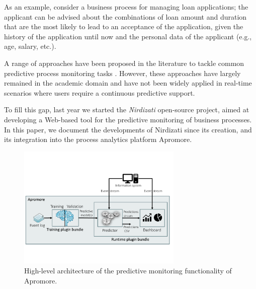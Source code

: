 \documentclass[runningheads,a4paper]{llncs}
\begin{document}
As an example, consider a business process for managing loan applications; the applicant can be advised about the combinations of loan amount and duration that are the most likely to lead to an acceptance of the application, given the history of the application until now and the personal data of the applicant (e.g., age, salary, etc.).

A range of approaches have been proposed in the literature to tackle common predictive process monitoring tasks \cite{Chamorro2017}.
However, these approaches have largely remained in the academic domain and have not been widely applied in real-time scenarios where users require a continuous predictive support.

To fill this gap, last year we started the \emph{Nirdizati} open-source project, aimed at developing a Web-based tool for the predictive monitoring of business processes. In this paper, we document the developments of Nirdizati since its creation, and its integration into the process analytics platform Apromore. 



\begin{figure}[t]%
	\centering
	\includegraphics[width=0.7\textwidth]{img/nirdizati-overall.pdf}
	\caption{High-level architecture of the predictive monitoring functionality of Apromore.}
	\label{fig:nirdizati-overall}
\end{figure}
\end{document}
